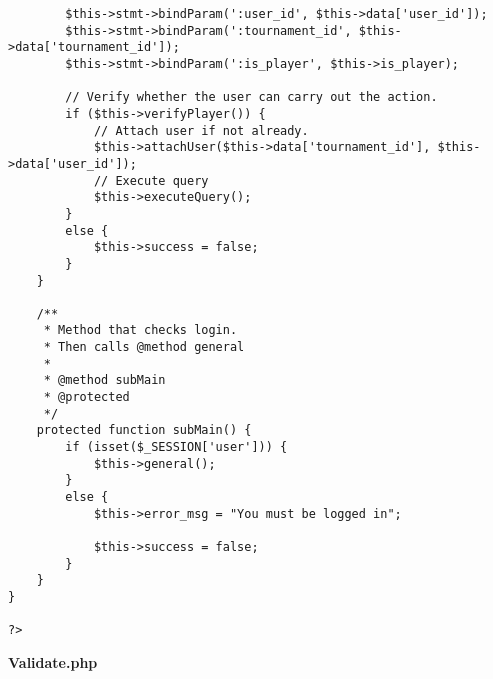 {\begin{lstlisting}
		$this->stmt->bindParam(':user_id', $this->data['user_id']);
		$this->stmt->bindParam(':tournament_id', $this->data['tournament_id']);
		$this->stmt->bindParam(':is_player', $this->is_player);

		// Verify whether the user can carry out the action.
		if ($this->verifyPlayer()) {
			// Attach user if not already.
			$this->attachUser($this->data['tournament_id'], $this->data['user_id']);
			// Execute query
			$this->executeQuery();
		}
		else {
			$this->success = false;
		}
	}

	/**
	 * Method that checks login.
	 * Then calls @method general
	 *
	 * @method subMain
	 * @protected
	 */
	protected function subMain() {
		if (isset($_SESSION['user'])) {
			$this->general();
		}
		else {
			$this->error_msg = "You must be logged in";

			$this->success = false;
		}
	}
}

?>\end{lstlisting}
}
\textbf{Validate.php}\label{Validate.php}

